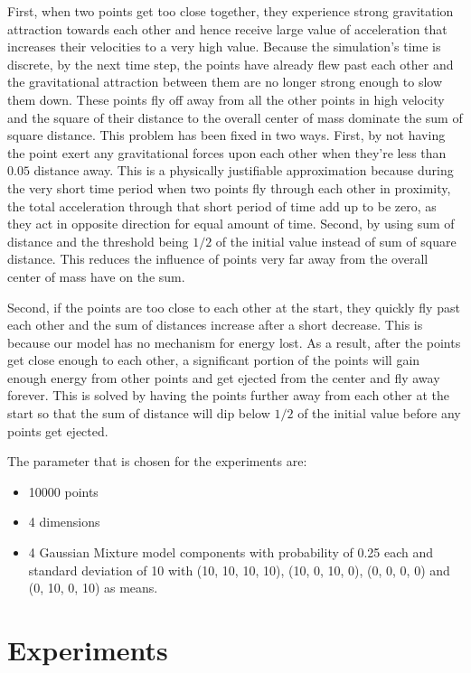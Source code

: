 \documentclass{article}
\begin{document}
First, when two points get too close together, they experience strong gravitation attraction towards
each other and hence receive large value of acceleration that increases their velocities to a very
high value. Because the simulation's time is discrete, by the next time step, the points have
already flew past each other and the gravitational attraction between them are no longer strong
enough to slow them down. These points fly off away from all the other points in high velocity and
the square of their distance to the overall center of mass dominate the sum of square distance. This
problem has been fixed in two ways. First, by not having the point exert any gravitational forces
upon each other when they're less than \(0.05\) distance away. This is a physically justifiable
approximation because during the very short time period when two points fly through each other in
proximity, the total acceleration through that short period of time add up to be zero, as they act
in opposite direction for equal amount of time. Second, by using sum of distance and the threshold
being \(1/2\) of the initial value instead of sum of square distance. This reduces the influence of
points very far away from the overall center of mass have on the sum.

Second, if the points are too close to each other at the start, they quickly fly past each other and
the sum of distances increase after a short decrease. This is because our model has no mechanism for
energy lost. As a result, after the points get close enough to each other, a significant portion of
the points will gain enough energy from other points and get ejected from the center and fly away
forever. This is solved by having the points further away from each other at the start so that the
sum of distance will dip below \(1/2\) of the initial value before any points get ejected.

The parameter that is chosen for the experiments are:
\begin{itemize}
	\item 10000 points
	\item 4 dimensions
	\item 4 Gaussian Mixture model components with probability of 0.25 each and standard deviation
		of 10 with (10, 10, 10, 10), (10, 0, 10, 0), (0, 0, 0, 0) and (0, 10, 0, 10) as means.
\end{itemize}

\clearpage
\section*{Experiments}
\end{document}
